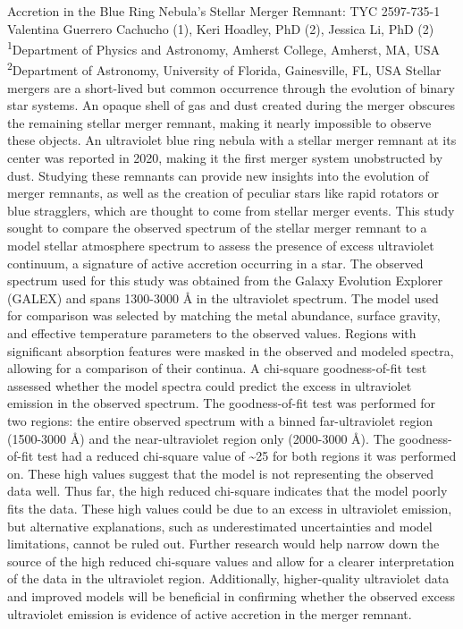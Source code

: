 \makeabstract
{
Accretion in the Blue Ring Nebula’s Stellar Merger Remnant: TYC 2597-735-1
}
{
Valentina Guerrero Cachucho (1), Keri Hoadley, PhD (2), Jessica Li, PhD (2)
}
{
\textsuperscript{1}Department of Physics and Astronomy, Amherst College, Amherst, MA, USA\\
\textsuperscript{2}Department of Astronomy, University of Florida, Gainesville, FL, USA
}
{
Stellar mergers are a short-lived but common occurrence through the evolution of binary star systems. An opaque shell of gas and dust created during the merger obscures the remaining stellar merger remnant, making it nearly impossible to observe these objects. An ultraviolet blue ring nebula with a stellar merger remnant at its center was reported in 2020, making it the first merger system unobstructed by dust. Studying these remnants can provide new insights into the evolution of merger remnants, as well as the creation of peculiar stars like rapid rotators or blue stragglers, which are thought to come from stellar merger events.
}
{
This study sought to compare the observed spectrum of the stellar merger remnant to a model stellar atmosphere spectrum to assess the presence of excess ultraviolet continuum, a signature of active accretion occurring in a star. The observed spectrum used for this study was obtained from the Galaxy Evolution Explorer (GALEX) and spans 1300-3000 Å in the ultraviolet spectrum. The model used for comparison was selected by matching the metal abundance, surface gravity, and effective temperature parameters to the observed values. Regions with significant absorption features were masked in the observed and modeled spectra, allowing for a comparison of their continua. A chi-square goodness-of-fit test assessed whether the model spectra could predict the excess in ultraviolet emission in the observed spectrum. The goodness-of-fit test was performed for two regions: the entire observed spectrum with a binned far-ultraviolet region (1500-3000 Å) and the near-ultraviolet region only (2000-3000 Å).
}
{
The goodness-of-fit test had a reduced chi-square value of \textasciitilde{}25 for both regions it was performed on. These high values suggest that the model is not representing the observed data well.
}
{
Thus far, the high reduced chi-square indicates that the model poorly fits the data. These high values could be due to an excess in ultraviolet emission, but alternative explanations, such as underestimated uncertainties and model limitations, cannot be ruled out. Further research would help narrow down the source of the high reduced chi-square values and allow for a clearer interpretation of the data in the ultraviolet region. Additionally, higher-quality ultraviolet data and improved models will be beneficial in confirming whether the observed excess ultraviolet emission is evidence of active accretion in the merger remnant.
}

\newpage
